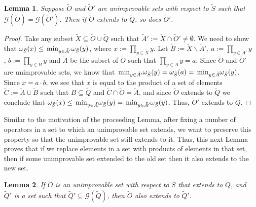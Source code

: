\documentclass[twocolumn,showpacs,preprintnumbers,amsmath,amssymb,nofootinbib,pra,floatfix]{revtex4-1}
\newtheorem{lemma}{Lemma}
\newenvironment{remark}[1][Remark]{\begin{trivlist}
\item[\hskip \labelsep {\bfseries #1}]}{\end{trivlist}}
\newcommand{\set}{\tilde}
\newcommand{\genfun}{\mathcal{G}}
\begin{document}
\begin{lemma}
\label{recombining elements preserves extension}
Suppose $\set O$ and $\set O'$ are unimprovable sets with respect to $\set S$ such that $\genfun(\set O)=\genfun(\set O')$.  Then if $\set O$ extends to $\set Q$, so does $\set O'$.
\end{lemma}

\begin{proof}
Take any subset $\set X \subseteq \set O\cup\set Q$ such that $\set A' := \set X\cap \set O' \ne \emptyset$.  We need to show that $\om_{\set S}(x)\le\min_{y\in\set A'}\om_{\set S}(y)$, where $x := \prod_{y\in\set X} y$.  Let $\set B := \set X \backslash \set A'$, $a := \prod_{y\in\set A'} y$, $b := \prod_{y\in\set B} y$ and $\set A$ be the subset of $\set O$ such that $\prod_{y\in\set A} y =a$.  Since $\set O$ and $\set O'$ are unimprovable sets, we know that $\min_{y\in\set A'}\om_{\set S}(y)=\om_{\set S}(a)=\min_{y\in\set A}\om_{\set S}(y)$.  Since $x=a\cdot b$, we see that $x$ is equal to the product of a set of elements $\set C := \set A \cup\set B$ such that $B\subseteq \set Q$ and $\set C\cap\set O=\set A$, and since $\set O$ extends to $\set Q$ we conclude that $\om_{\set S}(x)\le\min_{y\in\set A}\om_{\set S}(y)=\min_{y\in\set A'}\om_{\set S}(y)$.  Thus, $\set O'$ extends to $\set Q$.
\end{proof}
\begin{remark}
Similar to the motivation of the proceeding Lemma, after fixing a number of operators in a set to which an unimprovable set extends, we want to preserve this property so that the unimprovable set still extends to it.  Thus, this next Lemma proves that if we replace elements in a set with products of elements in that set, then if some unimprovable set extended to the old set then it also extends to the new set.
\end{remark}

\begin{lemma}
\label{recombining extension elements preserves extension}
If $\set O$ is an unimprovable set with respect to $\set S$ that extends to $\set Q$, and $\set Q'$ is a set such that $\set Q'\subseteq\genfun(\set Q)$, then $\set O$ also extends to $\set Q'$.
\end{lemma}
\end{document}
